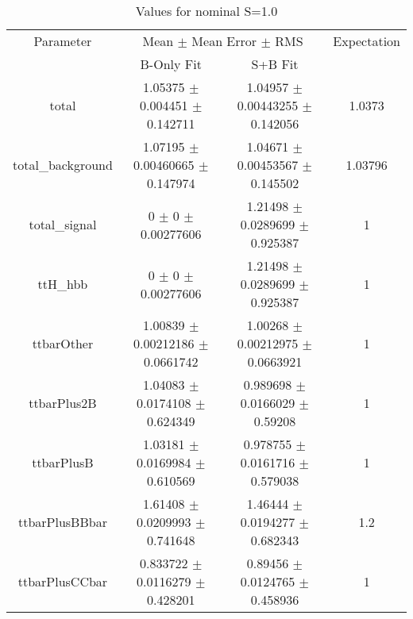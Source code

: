\begin{table}
\centering
\caption{Values for nominal S=1.0}
\begin{tabular}{cccc}
\toprule
Parameter & \multicolumn{2}{c}{Mean $\pm$ Mean Error $\pm$ RMS} & Expectation\\
 & B-Only Fit & S+B Fit & \\
\midrule
total & \num{1.05375} $\pm$ \num{0.004451} $\pm$ \num{0.142711} & \num{1.04957} $\pm$ \num{0.00443255} $\pm$ \num{0.142056} & \num{1.0373}\\
total\_background & \num{1.07195} $\pm$ \num{0.00460665} $\pm$ \num{0.147974} & \num{1.04671} $\pm$ \num{0.00453567} $\pm$ \num{0.145502} & \num{1.03796}\\
total\_signal & \num{0} $\pm$ \num{0} $\pm$ \num{0.00277606} & \num{1.21498} $\pm$ \num{0.0289699} $\pm$ \num{0.925387} & \num{1}\\
ttH\_hbb & \num{0} $\pm$ \num{0} $\pm$ \num{0.00277606} & \num{1.21498} $\pm$ \num{0.0289699} $\pm$ \num{0.925387} & \num{1}\\
ttbarOther & \num{1.00839} $\pm$ \num{0.00212186} $\pm$ \num{0.0661742} & \num{1.00268} $\pm$ \num{0.00212975} $\pm$ \num{0.0663921} & \num{1}\\
ttbarPlus2B & \num{1.04083} $\pm$ \num{0.0174108} $\pm$ \num{0.624349} & \num{0.989698} $\pm$ \num{0.0166029} $\pm$ \num{0.59208} & \num{1}\\
ttbarPlusB & \num{1.03181} $\pm$ \num{0.0169984} $\pm$ \num{0.610569} & \num{0.978755} $\pm$ \num{0.0161716} $\pm$ \num{0.579038} & \num{1}\\
ttbarPlusBBbar & \num{1.61408} $\pm$ \num{0.0209993} $\pm$ \num{0.741648} & \num{1.46444} $\pm$ \num{0.0194277} $\pm$ \num{0.682343} & \num{1.2}\\
ttbarPlusCCbar & \num{0.833722} $\pm$ \num{0.0116279} $\pm$ \num{0.428201} & \num{0.89456} $\pm$ \num{0.0124765} $\pm$ \num{0.458936} & \num{1}\\
\bottomrule
\end{tabular}
\end{table}